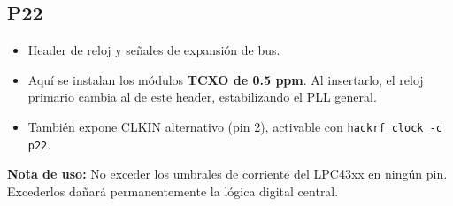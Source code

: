 \documentclass[11pt]{article}
\begin{document}
\subsection*{P22}
\begin{itemize}
    \item Header de reloj y señales de expansión de bus.
    \item Aquí se instalan los módulos \textbf{TCXO de 0.5 ppm}. Al insertarlo, el reloj primario cambia al de este header, estabilizando el PLL general.
    \item También expone CLKIN alternativo (pin 2), activable con \texttt{hackrf\_clock -c p22}.
\end{itemize}

\textbf{Nota de uso:} No exceder los umbrales de corriente del LPC43xx en ningún pin. Excederlos dañará permanentemente la lógica digital central.
\end{document}
